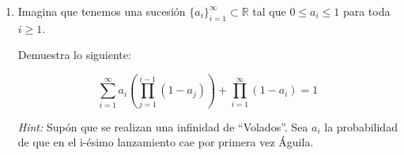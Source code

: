 \documentclass[11pt,letterpaper]{report}
\newcommand{\R}{\mathbb{R}}
\begin{document}
\begin{enumerate}
\begin{proof}
    \underline{Hipótesis de inducción:} Es válida para $n$.
    
    \underline{Paso inductivo:} $n = n+1$.
    \begin{align*}
        P_{n+1}
            &= p + (1 - 2p)P_n && \text{Usando $(3)$}\\
            &= p + (1 - 2p)(\frac{1+ (1-2p)^n}{2}) && \text{Sustituyendo $P_n$ por $(2)$}\\
            &= p + (\frac{1+ (1-2p)^n}{2}) - (\frac{2p+ 2p(1-2p)^n}{2}) && \text{Aritmética}\\
            &= p + (\frac{1+ (1-2p)^n - 2p - 2p(1-2p)^n}{2}) && \text{Aritmética}\\
            &= \frac{2p +1+ (1-2p)^n - 2p - 2p(1-2p)^n}{2} && \text{Aritmética}\\
            &= \frac{2p +1+ (1-2p)^n - 2p - 2p(1-2p)^n}{2} && \text{Aritmética}\\
            &= \frac{1 + (1 - 2p)^n(1-2p)}{2} && \text{Aritmética}\\
            &= \frac{1 + (1 - 2p)^{n+1}}{2} && \text{Leyes exponentes}
    \end{align*}

\end{proof}

\item Imagina que tenemos una sucesión $\{ a_i \}_{i=1}^{\infty} \subset \R$ tal que
$0 \leq a_i \leq 1$ para toda $i \geq 1$.

Demuestra lo siguiente:

\[
    \sum_{i=1}^{\infty} a_i (\prod_{j=1}^{i-1} (1 - a_j)) +
        \prod_{i=1}^{\infty} (1 - a_i) = 1
\]

\textit{Hint:} Supón que se realizan una infinidad de ``Volados''. Sea $a_i$ la probabilidad de que
en el i-ésimo lanzamiento cae por primera vez Águila.


\end{enumerate}
\end{document}
